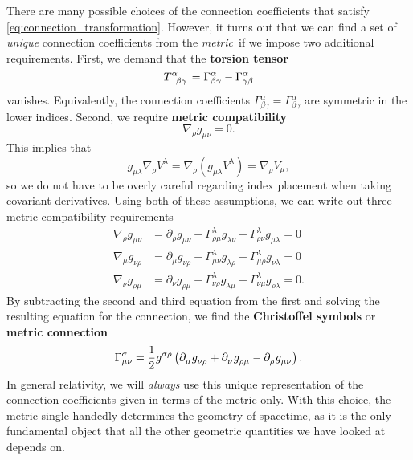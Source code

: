 There are many possible choices of the connection coefficients that satisfy \cref{eq:connection_transformation}.
However, it turns out that we can find a set of \emph{unique} connection coefficients from the \emph{metric} if we impose two additional requirements.
First, we demand that the \textbf{torsion tensor}
\begin{equation}
	T\indices{^\alpha_\beta_\gamma} = \Gamma^\alpha_{\beta\gamma} - \Gamma^\alpha_{\gamma\beta}
	\label{eq:torsion_tensor}
\end{equation}
vanishes.
Equivalently, the connection coefficients $ \Gamma^\alpha_{\beta\gamma} = \Gamma^\alpha_{\beta\gamma} $ are symmetric in the lower indices.
Second, we require \textbf{metric compatibility}
\begin{equation}
	\nabla_\rho g_{\mu \nu} = 0 .
\end{equation}
This implies that
\begin{equation}
	g_{\mu \lambda} \nabla_\rho V^\lambda = \nabla_\rho (g_{\mu \lambda} V^\lambda) = \nabla_\rho V_\mu ,
\end{equation}
so we do not have to be overly careful regarding index placement when taking covariant derivatives.
Using both of these assumptions, we can write out three metric compatibility requirements
\newcommand\metriccompatibilityequation[3]{\nabla_{#1} g_{{#2}{#3}} &= \partial_{#1} g_{{#2}{#3}} - \Gamma^\lambda_{{#1}{#2}} g_{\lambda {#3}} - \Gamma^\lambda_{{#1}{#3}} g_{{#2} \lambda} = 0}
\begin{align}
	\metriccompatibilityequation{\rho}{\mu}{\nu} \\
	\metriccompatibilityequation{\mu}{\nu}{\rho} \\
	\metriccompatibilityequation{\nu}{\rho}{\mu} .
\end{align}
By subtracting the second and third equation from the first and solving the resulting equation for the connection, we find the \textbf{Christoffel symbols} or \textbf{metric connection}
\begin{equation}
	\Gamma^\sigma_{\mu \nu} = \frac{1}{2} g\indices{^\sigma^\rho} \left(
		\partial\indices{_\mu} g\indices{_\nu_\rho} +
		\partial\indices{_\nu} g\indices{_\rho_\mu} -
		\partial\indices{_\rho} g\indices{_\mu_\nu}
	\right) .
	\label{eq:def_christoffel}
\end{equation}
In general relativity, we will \emph{always} use this unique representation of the connection coefficients given in terms of the metric only.
With this choice, the metric single-handedly determines the geometry of spacetime, as it is the only fundamental object that all the other geometric quantities we have looked at depends on.

